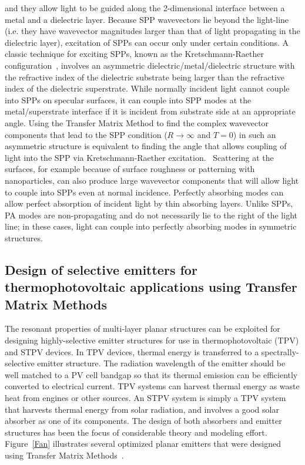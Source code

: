 \documentclass[review]{elsarticle}
\begin{document}
and they allow light to be guided along the 2-dimensional interface between a metal and a dielectric layer.  Because SPP wavevectors lie beyond the light-line (i.e. they have wavevector magnitudes larger than that of light propagating in the dielectric layer), excitation of SPPs can occur only under certain conditions.  A classic technique for exciting SPPs, known as the Kretschmann-Raether configuration~\cite{Raether},  involves an asymmetric dielectric/metal/dielectric structure with the refractive index of the dielectric substrate being larger than the refractive index of the dielectric superstrate.  While normally incident light cannot couple into SPPs on specular surfaces, it can couple into SPP modes at the metal/superstrate interface if it is incident from substrate side at an appropriate angle.  Using the Transfer Matrix Method to find the complex wavevector components that lead to the SPP condition ($R \rightarrow \infty$ and $T=0$) in such an asymmetric structure is equivalent to finding the angle that allows coupling of light into the SPP via Kretschmann-Raether excitation.~\cite{Raether, FHR_SciRep_2015}  Scattering at the surfaces, for example because of surface roughness or patterning with nanoparticles, can also produce large wavevector components that will allow light to couple into SPPs even at normal incidence.  Perfectly absorbing
modes can allow perfect absorption of incident light by thin absorbing layers.  Unlike SPPs, PA modes are 
non-propagating and do not necessarily lie to the right of the light line; in these cases, light can couple into perfectly absorbing modes in symmetric structures.~\cite{FHR_SciRep_2015}

\subsection{Design of selective emitters for thermophotovoltaic applications using Transfer Matrix Methods}
The resonant properties of multi-layer planar structures can be exploited for designing highly-selective emitter structures for use in
thermophotovoltaic (TPV) and STPV devices.  In TPV devices, thermal energy is transferred to a 
spectrally-selective emitter
structure.  The radiation wavelength of the emitter should be well matched to a PV cell bandgap so that its thermal emission can be efficiently converted
to electrical current.  TPV systems can harvest thermal energy as waste heat from engines or other sources.  An STPV system is simply 
a TPV system that harvests thermal energy from solar radiation, and involves a good solar absorber as one of its components.
The design of both absorbers and emitter structures has been the focus of considerable theory and modeling effort.
Figure~\ref{Fan} illustrates several optimized planar emitters that were designed using Transfer Matrix Methods~\cite{BN_JApplPhys_2005, LZ_JApplPhys_2006, RF_OptExp_2009}.
\end{document}
